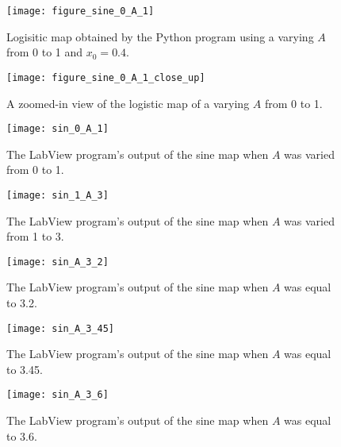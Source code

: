 \documentclass[12pt]{report}
\theoremstyle{definition}
\begin{document}
\clearpage

%
%

\begin{figure}[!htb]
\centering
\texttt{[image: figure\_sine\_0\_A\_1]}
\caption{Logisitic map obtained by the Python program using a varying $A$ from 0 to 1 and $x_0=0.4$. \label{fig:sine_0_A_1}}
\end{figure}

\begin{figure}[!htb]
\centering
\texttt{[image: figure\_sine\_0\_A\_1\_close\_up]}
\caption{A zoomed-in view of the logistic map of a varying $A$ from 0 to 1. \label{fig:sine_0_A_1_closeup}}
\end{figure}

\begin{figure}[!htb]
\centering
\texttt{[image: sin\_0\_A\_1]}
\caption{The LabView program's output of the sine map when $A$ was varied from 0 to 1. \label{sin01}}
\end{figure}

\begin{figure}[!htb]
\centering
\texttt{[image: sin\_1\_A\_3]}
\caption{The LabView program's output of the sine map when $A$ was varied from 1 to 3. \label{sin13}}
\end{figure}

\begin{figure}[!htb]
\centering
\texttt{[image: sin\_A\_3\_2]}
\caption{The LabView program's output of the sine map when $A$ was equal to 3.2. \label{sin3.2}}
\end{figure}

\begin{figure}[!htb]
\centering
\texttt{[image: sin\_A\_3\_45]}
\caption{The LabView program's output of the sine map when $A$ was equal to 3.45. \label{sin3.45}}
\end{figure}

\begin{figure}[!htb]
\centering
\texttt{[image: sin\_A\_3\_6]}
\caption{The LabView program's output of the sine map when $A$ was equal to 3.6. \label{sin3.6}}
\end{figure}

\clearpage

%
%
\end{document}
